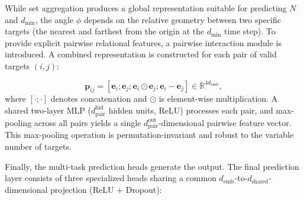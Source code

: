 \documentclass[a4paper,fleqn]{cas-dc}
\begin{document}
While set aggregation produces a global representation suitable for predicting $N$ and $d_{\min}$, the angle $\phi$ depends on the relative geometry between two specific targets (the nearest and farthest from the origin at the $d_{\min}$ time step). To provide explicit pairwise relational features, a pairwise interaction module is introduced. A combined representation is constructed for each pair of valid targets $(i, j)$:

\begin{equation}
    \bm{p}_{ij} = [\bm{e}_i; \bm{e}_j; \bm{e}_i \odot \bm{e}_j; \bm{e}_i - \bm{e}_j] \in \mathbb{R}^{4 d_{\text{emb}}},
\end{equation}
where $[\cdot; \cdot]$ denotes concatenation and $\odot$ is element-wise multiplication. A shared two-layer MLP ($d_{\text{pair}}^{\text{hid}}$ hidden units, ReLU) processes each pair, and max-pooling across all pairs yields a single $d_{\text{pair}}^{\text{out}}$-dimensional pairwise feature vector. This max-pooling operation is permutation-invariant and robust to the variable number of targets.

Finally, the multi-task prediction heads generate the output. The final prediction layer consists of three specialized heads sharing a common $d_{\text{emb}}$-to-$d_{\text{shared}}$-dimensional projection (ReLU + Dropout):
\end{document}
